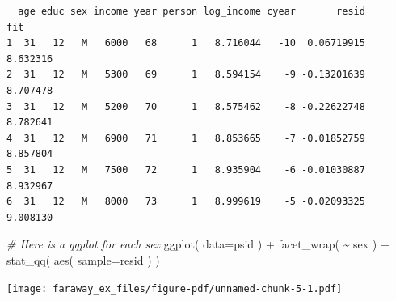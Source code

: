 \documentclass[
  letterpaper,
  DIV=11,
  numbers=noendperiod]{scrreprt}
\newenvironment{Shaded}{}{}
\newcommand{\AttributeTok}[1]{\textcolor[rgb]{0.49,0.56,0.16}{#1}}
\newcommand{\CommentTok}[1]{\textcolor[rgb]{0.38,0.63,0.69}{\textit{#1}}}
\newcommand{\ControlFlowTok}[1]{\textcolor[rgb]{0.00,0.44,0.13}{\textbf{#1}}}
\newcommand{\DecValTok}[1]{\textcolor[rgb]{0.25,0.63,0.44}{#1}}
\newcommand{\FloatTok}[1]{\textcolor[rgb]{0.25,0.63,0.44}{#1}}
\newcommand{\FunctionTok}[1]{\textcolor[rgb]{0.02,0.16,0.49}{#1}}
\newcommand{\NormalTok}[1]{#1}
\newcommand{\OtherTok}[1]{\textcolor[rgb]{0.00,0.44,0.13}{#1}}
\newcommand{\SpecialCharTok}[1]{\textcolor[rgb]{0.25,0.44,0.63}{#1}}
\begin{document}
\begin{verbatim}
  age educ sex income year person log_income cyear       resid      fit
1  31   12   M   6000   68      1   8.716044   -10  0.06719915 8.632316
2  31   12   M   5300   69      1   8.594154    -9 -0.13201639 8.707478
3  31   12   M   5200   70      1   8.575462    -8 -0.22622748 8.782641
4  31   12   M   6900   71      1   8.853665    -7 -0.01852759 8.857804
5  31   12   M   7500   72      1   8.935904    -6 -0.01030887 8.932967
6  31   12   M   8000   73      1   8.999619    -5 -0.02093325 9.008130
\end{verbatim}

\begin{Shaded}
\begin{Highlighting}[]
\CommentTok{\# Here is a qqplot for each sex}
\FunctionTok{ggplot}\NormalTok{( }\AttributeTok{data=}\NormalTok{psid ) }\SpecialCharTok{+}
    \FunctionTok{facet\_wrap}\NormalTok{( }\SpecialCharTok{\textasciitilde{}}\NormalTok{ sex ) }\SpecialCharTok{+}
    \FunctionTok{stat\_qq}\NormalTok{( }\FunctionTok{aes}\NormalTok{( }\AttributeTok{sample=}\NormalTok{resid ) )}
\end{Highlighting}
\end{Shaded}

\texttt{[image: faraway\_ex\_files/figure-pdf/unnamed-chunk-5-1.pdf]}

\begin{Shaded}
\end{Shaded}
\end{document}
